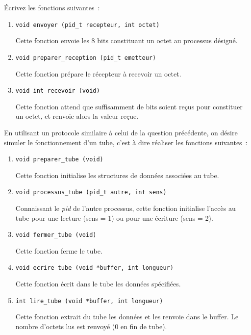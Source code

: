 Écrivez les fonctions suivantes~:

\begin {enumerate}
    \item \verb:void envoyer (pid_t recepteur, int octet):

	Cette fonction envoie les 8 bits constituant un octet au
	processus désigné.

    \item \verb:void preparer_reception (pid_t emetteur):

	Cette fonction prépare le récepteur à recevoir un octet.

    \item \verb:void int recevoir (void):

	Cette fonction attend que suffisamment de bits soient reçus
	pour constituer un octet,  et renvoie alors la valeur reçue.

\end {enumerate}


\question

En utilisant un protocole similaire à celui de la question précédente,
on désire simuler le fonctionnement d'un tube, c'est à dire réaliser
les fonctions suivantes~:

\begin {enumerate}
    \item \verb:void preparer_tube (void):

	Cette fonction initialise les structures de données associées
	au tube.

    \item \verb:void processus_tube (pid_t autre, int sens):

	Connaissant le \textit {pid} de l'autre processus, cette
	fonction initialise l'accès au tube pour une lecture (sens
	= 1) ou pour une écriture (sens = 2).

    \item \verb:void fermer_tube (void):

	Cette fonction ferme le tube.

    \item \verb:void ecrire_tube (void *buffer, int longueur):

	Cette fonction écrit dans le tube les données spécifiées.

    \item \verb:int lire_tube (void *buffer, int longueur):

	Cette fonction extrait du tube les données et les renvoie
	dans le buffer. Le nombre d'octets lus est renvoyé (0 en
	fin de tube).

\end {enumerate}


